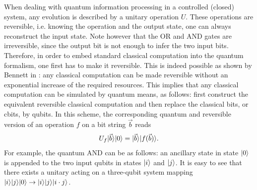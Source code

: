 \documentclass[a4paper]{article}
\begin{document}
When dealing with quantum information processing in a controlled (closed)
system, any evolution is described by a unitary operation $U$.
These operations are reversible, i.e. knowing the operation and
the output state, one can always reconstruct the input state. Note
however that the OR and AND gates are irreversible, since the output bit
is not enough to infer the two input bits.
Therefore, in order to embed standard classical computation into the
quantum formalism, one first has to make it reversible. This is
indeed possible as shown by Bennett in \cite{revcomp}: any
classical computation can be made reversible without an
exponential increase of the required resources. This implies that
any classical computation can be simulated by quantum means, as
follows: first construct the equivalent reversible classical
computation and then replace the classical bits, or cbits, by qubits. In this scheme, the
corresponding quantum and reversible version of an operation $f$
on a bit string $\vec b$ reads
\begin{equation}\label{revf}
    U_f|\vec b\rangle|0\rangle=|\vec b\rangle|f(\vec b)\rangle .
\end{equation}
For example, the quantum AND can be as follows: an ancillary state
in state $|0\rangle$ is appended to the two input qubits in states $|i\rangle$
and $|j\rangle$. It is easy to see that there exists a unitary acting
on a three-qubit system mapping $|i\rangle|j\rangle|0\rangle\rightarrow|i\rangle|j\rangle|i\cdot j\rangle$.
\end{document}
